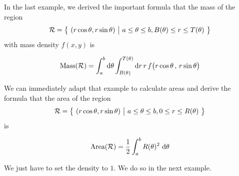 In the last example, we derived the important formula that the mass 
of the region
\begin{equation*}
\mathcal{R}=\big\{ \ (r\cos\theta,r\sin\theta)\ \big|\ a\le\theta\le b, 
               B(\theta)\le r\le T(\theta)\ \big\}
\end{equation*}
with mass density $f(x,y)$ is
\begin{impeqn}\label{eq polar mass}
\begin{equation*}
\text{Mass}(\mathcal{R}) = \int_a^b  \mathrm{d}\theta 
             \int_{B(\theta)}^{T(\theta)}  \mathrm{d}r\,r\,
                   f\big(r\cos\theta\,,\,r\sin\theta\big)
\end{equation*}
\end{impeqn}
\noindent We can immediately adapt that example to calculate areas and derive the formula
that the area of the region
\begin{equation*}
\mathcal{R}=\big\{ \ (r\cos\theta,r\sin\theta)\ \big|\ a\le\theta\le b, 
              0\le r\le R(\theta)\ \big\}
\end{equation*}
is
\begin{impeqn}\label{eq polar area}
\begin{equation*}
\text{Area}(\mathcal{R}) =\frac{1}{2} \int_a^b R(\theta)^2\  \mathrm{d}\theta 
\end{equation*}
\end{impeqn}
\noindent We just have to set the density to $1$. We do so in the next example.

